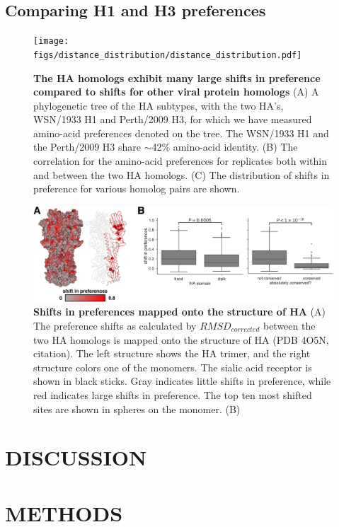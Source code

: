 \documentclass[11pt]{article}
\begin{document}
\subsection*{Comparing H1 and H3 preferences}

\begin{figure}
\centerline{\texttt{[image: figs/distance\_distribution/distance\_distribution.pdf]}}
\caption{\label{fig:distance_distribution}
{\bf The HA homologs exhibit many large shifts in preference compared to shifts for other viral protein homologs}
(A) A phylogenetic tree of the HA subtypes, with the two HA's, WSN/1933 H1 and Perth/2009 H3, for which we have measured amino-acid preferences denoted on the tree. 
The WSN/1933 H1 and the Perth/2009 H3 share $\sim$42\% amino-acid identity.
(B) The correlation for the amino-acid preferences for replicates both within and between the two HA homologs.
(C) The distribution of shifts in preference for various homolog pairs are shown.
}
\end{figure}

\begin{figure}
\centerline{\includegraphics[width=\textwidth]{figs/RMSD_heatmap/RMSD_heatmap.pdf}}
\caption{\label{fig:RMSD_heatmap}
{\bf Shifts in preferences mapped onto the structure of HA}
(A) The preference shifts as calculated by $RMSD_{corrected}$ between the two HA homologs is mapped onto the structure of HA (PDB 4O5N, citation). 
The left structure shows the HA trimer, and the right structure colors one of the monomers. 
The sialic acid receptor is shown in black sticks.
Gray indicates little shifts in preference, while red indicates large shifts in preference.
The top ten most shifted sites are shown in spheres on the monomer.
(B)
}
\end{figure}


\section*{DISCUSSION}


\clearpage
\small

\section*{METHODS}
\label{sec:methods}
\end{document}
